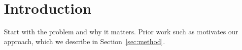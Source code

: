 \section{Introduction}
\label{sec:intro}

Start with the problem and why it matters. Prior work such as
\citet{vaswani2017attention} motivates our approach, which we describe in
Section~\ref{sec:method}.
